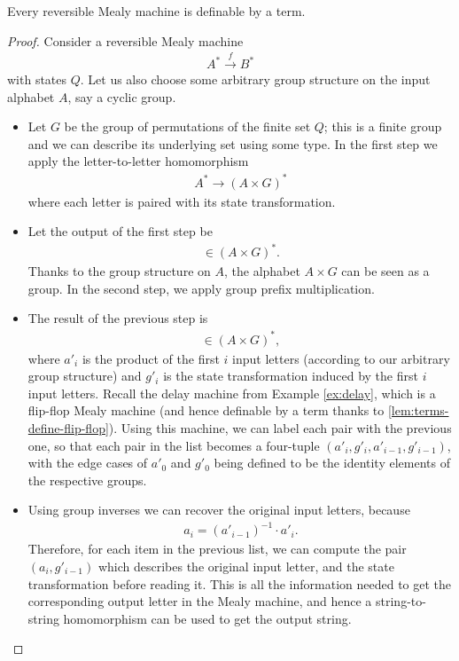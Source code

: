 \begin{lemma}
    \label{lem:terms-define-reversible}
    Every reversible Mealy machine is definable by a term.
\end{lemma}
\begin{proof}
        Consider a reversible  Mealy machine 
    \begin{align*}
    A^* \xrightarrow f B^*
    \end{align*}
    with states $Q$.  Let us also choose some arbitrary group structure on the input alphabet $A$, say a cyclic group. 

    \begin{itemize}
        \item  Let $G$ be the group of permutations of the finite set $Q$; this is a finite group and we can describe its underlying set using some type. In the first step we apply the letter-to-letter homomorphism
        \begin{align*}
        A^* \to (A \times G)^*
        \end{align*}
        where each letter is paired with its state transformation.
        \item Let the output of the first step be
        \begin{align*}
        [(a_1,g_1), \ldots, (a_n,g_n)] \in (A \times G)^*. 
        \end{align*}
        Thanks to the group structure on $A$,  the alphabet $A \times G$ can be seen as a group. In the second step, we apply group prefix multiplication.
        \item The result of the previous step is 
        \begin{align*}
        [(a'_1,g'_1),  \ldots, (a'_n, g'_n)] \in (A \times G)^*,
        \end{align*}
        where $a'_i$ is the product of the first  $i$  input letters (according to our arbitrary group structure) and $g'_i$ is the state transformation induced by the first $i$ input letters. Recall the  delay machine from Example \ref{ex:delay}, which is a flip-flop Mealy machine (and hence definable by a term thanks to \cref{lem:terms-define-flip-flop}). Using this machine, we can label each pair with the previous one, so that each pair in the list becomes a four-tuple $(a'_i,g'_i,a'_{i-1},g'_{i-1})$, with the edge cases of  $a'_0$ and $g'_0$ being defined to be  the identity elements of the respective groups. 
        \item Using group inverses we can recover the original input letters, because 
        \begin{align*}
        a_i = (a'_{i-1})^{-1} \cdot a'_i.
        \end{align*}
        Therefore, for each item in the previous list, we can compute the pair $(a_i,g'_{i-1})$ which describes the original input letter, and the state transformation before reading it. This is all the information needed to get the corresponding output letter in the Mealy machine, and hence a string-to-string homomorphism can be used to get the output string.
    \end{itemize}
\end{proof}

